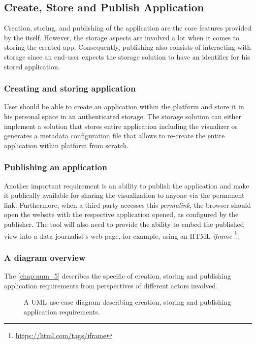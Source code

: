 \subsection{Create, Store and Publish Application}

Creation, storing, and publishing of the application are the core features provided by the \lpa{} itself. However, the storage aspects are involved a lot when it comes to storing the created app. Consequently, publishing also consists of interacting with storage since an end-user expects the storage solution to have an identifier for his stored application.

\subsubsection{Creating and storing application}

User should be able to create an application within the \lpa{} platform and store it in his personal space in an authenticated storage. The storage solution can either implement a solution that stores entire application including the visualizer or generates a metadata configuration file that allows to re-create the entire application within \lpa{} platform from scratch.

\subsubsection{Publishing an application}

Another important requirement is an ability to publish the application and make it publically available for sharing the visualization to anyone via the permanent link. Furthermore, when a third party accesses this \textit{permalink}, the browser should open the \lpa{} website with the respective application opened, as configured by the publisher. The tool will also need to provide the ability to embed the published view into a data journalist's web page, for example, using an HTML \textit{iframe} \footnote{\url{https://html.com/tags/iframe}}. 

\subsubsection{A diagram overview}

The \autoref{chap:num_5} describes the specific of creation, storing and publishing application requirements from perspectives of different actors involved. 

\begin{figure}[h]
\centering
{}
\caption{A UML use-case diagram describing creation, storing and publishing application requirements.}
\label{fig:lpa_creating_apps_use_case}
\end{figure}

